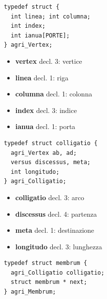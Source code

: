 \documentclass[8pt]{book}
\begin{document}
\begin{spacing}{0.9}
  \begin{small}
    \begin{tcolorbox}
\begin{verbatim}
typedef struct {
  int linea; int columna;
  int index;
  int ianua[PORTE];
} agri_Vertex;
\end{verbatim}
  \end{tcolorbox}
    \end{small}
      \end{spacing}

\begin{itemize}

\item
  \textbf{vertex} decl. 3: vertice
\item
  \textbf{linea} decl. 1: riga
\item
  \textbf{columna} decl. 1: colonna
\item
  \textbf{index} decl. 3: indice
\item
  \textbf{ianua} decl. 1: porta
\end{itemize}

\begin{spacing}{0.9}
  \begin{small}
    \begin{tcolorbox}
\begin{verbatim}
typedef struct colligatio {
  agri_Vertex ab, ad;
  versus discessus, meta;
  int longitudo;
} agri_Colligatio;
\end{verbatim}
  \end{tcolorbox}
    \end{small}
      \end{spacing}

\begin{itemize}

\item
  \textbf{colligatio} decl. 3: arco
\item
  \textbf{discessus} decl. 4: partenza
\item
  \textbf{meta} decl. 1: destinazione
\item
  \textbf{longitudo} decl. 3: lunghezza
\end{itemize}

\begin{spacing}{0.9}
  \begin{small}
    \begin{tcolorbox}
\begin{verbatim}
typedef struct membrum {
  agri_Colligatio colligatio;
  struct membrum * next;
} agri_Membrum;
\end{verbatim}
  \end{tcolorbox}
    \end{small}
      \end{spacing}
\end{document}
